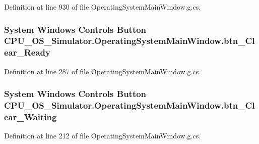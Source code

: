 Definition at line 930 of file Operating\+System\+Main\+Window.\+g.\+cs.

\hypertarget{class_c_p_u___o_s___simulator_1_1_operating_system_main_window_a926540a5fc98f177282e425055964cb9}{}
\subsubsection[{btn\+\_\+\+Clear\+\_\+\+Ready}]{\setlength{\rightskip}{0pt plus 5cm}System Windows Controls Button C\+P\+U\+\_\+\+O\+S\+\_\+\+Simulator.\+Operating\+System\+Main\+Window.\+btn\+\_\+\+Clear\+\_\+\+Ready\hspace{0.3cm}{\ttfamily [package]}}\label{class_c_p_u___o_s___simulator_1_1_operating_system_main_window_a926540a5fc98f177282e425055964cb9}


Definition at line 287 of file Operating\+System\+Main\+Window.\+g.\+cs.

\hypertarget{class_c_p_u___o_s___simulator_1_1_operating_system_main_window_abbbabd3ef96781478b77ea937e312eb1}{}
\subsubsection[{btn\+\_\+\+Clear\+\_\+\+Waiting}]{\setlength{\rightskip}{0pt plus 5cm}System Windows Controls Button C\+P\+U\+\_\+\+O\+S\+\_\+\+Simulator.\+Operating\+System\+Main\+Window.\+btn\+\_\+\+Clear\+\_\+\+Waiting\hspace{0.3cm}{\ttfamily [package]}}\label{class_c_p_u___o_s___simulator_1_1_operating_system_main_window_abbbabd3ef96781478b77ea937e312eb1}


Definition at line 212 of file Operating\+System\+Main\+Window.\+g.\+cs.

